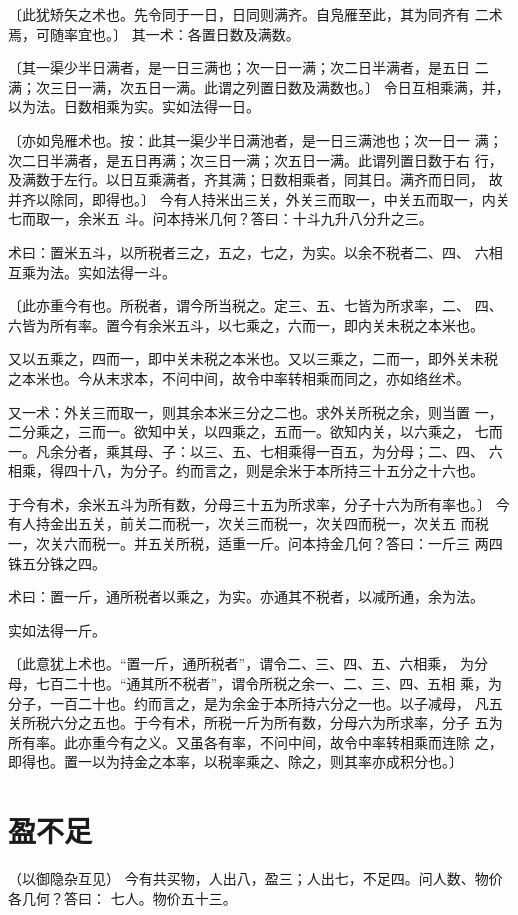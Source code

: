 \documentclass[a4paper,12pt,UTF8,twoside]{ctexbook}
\begin{document}
〔此犹矫矢之术也。先令同于一日，日同则满齐。自凫雁至此，其为同齐有 二术焉，可随率宜也。〕 其一术：各置日数及满数。

〔其一渠少半日满者，是一日三满也；次一日一满；次二日半满者，是五日 二满；次三日一满，次五日一满。此谓之列置日数及满数也。〕 令日互相乘满，并，以为法。日数相乘为实。实如法得一日。

〔亦如凫雁术也。按：此其一渠少半日满池者，是一日三满池也；次一日一 满；次二日半满者，是五日再满；次三日一满；次五日一满。此谓列置日数于右 行，及满数于左行。以日互乘满者，齐其满；日数相乘者，同其日。满齐而日同， 故并齐以除同，即得也。〕 今有人持米出三关，外关三而取一，中关五而取一，内关七而取一，余米五 斗。问本持米几何？答曰：十斗九升八分升之三。

术曰：置米五斗，以所税者三之，五之，七之，为实。以余不税者二、四、 六相互乘为法。实如法得一斗。

〔此亦重今有也。所税者，谓今所当税之。定三、五、七皆为所求率，二、 四、六皆为所有率。置今有余米五斗，以七乘之，六而一，即内关未税之本米也。

又以五乘之，四而一，即中关未税之本米也。又以三乘之，二而一，即外关未税 之本米也。今从末求本，不问中间，故令中率转相乘而同之，亦如络丝术。

又一术：外关三而取一，则其余本米三分之二也。求外关所税之余，则当置 一，二分乘之，三而一。欲知中关，以四乘之，五而一。欲知内关，以六乘之， 七而一。凡余分者，乘其母、子：以三、五、七相乘得一百五，为分母；二、四、 六相乘，得四十八，为分子。约而言之，则是余米于本所持三十五分之十六也。

于今有术，余米五斗为所有数，分母三十五为所求率，分子十六为所有率也。〕 今有人持金出五关，前关二而税一，次关三而税一，次关四而税一，次关五 而税一，次关六而税一。并五关所税，适重一斤。问本持金几何？答曰：一斤三 两四铢五分铢之四。

术曰：置一斤，通所税者以乘之，为实。亦通其不税者，以减所通，余为法。

实如法得一斤。

〔此意犹上术也。“置一斤，通所税者”，谓令二、三、四、五、六相乘， 为分母，七百二十也。“通其所不税者”，谓令所税之余一、二、三、四、五相 乘，为分子，一百二十也。约而言之，是为余金于本所持六分之一也。以子减母， 凡五关所税六分之五也。于今有术，所税一斤为所有数，分母六为所求率，分子 五为所有率。此亦重今有之义。又虽各有率，不问中间，故令中率转相乘而连除 之，即得也。置一以为持金之本率，以税率乘之、除之，则其率亦成积分也。〕 

\chapter{盈不足}
（以御隐杂互见） 今有共买物，人出八，盈三；人出七，不足四。问人数、物价各几何？答曰： 七人。物价五十三。
\end{document}
